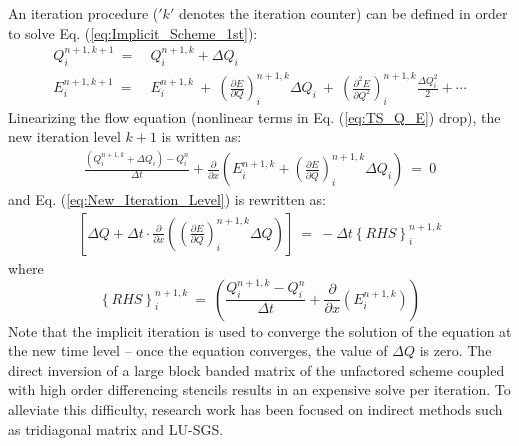 \documentclass[conf]{new-aiaa}
\begin{document}
An iteration procedure ($'k'$ denotes the iteration counter) can be defined in order to solve Eq. (\ref{eq:Implicit_Scheme_1st}):
\begin{equation}
	\label{eq:TS_Q_E}
	\begin{split}
	Q_i^{n+1, k+1}~=&~Q_i^{n+1, k}+\Delta{Q}_i \\
	E_i^{n+1, k+1}~=&~E_i^{n+1, k}~+~\left(\frac{\partial{E}}{\partial{Q}} \right)^{n+1, k}_i\Delta{Q}_i~+~ \left(\frac{\partial^2{E}}{\partial{Q^2}} \right)^{n+1, k}_i\frac{\Delta{Q}^2_i}{2}+\cdots
	\end{split}
\end{equation}
Linearizing the flow equation (nonlinear terms in Eq. (\ref{eq:TS_Q_E}) drop), the new iteration level $k+1$ is written as:
\begin{equation}
	\begin{split}
		\label{eq:New_Iteration_Level}
  			\frac{\left(Q_i^{n+1, k}+\Delta{Q}_i\right)-Q_i^n}{\Delta{t}}+\frac{\partial}{\partial{x}}\left(E_i^{n+1, k} + \left(\frac{\partial{E}}{\partial{Q}} \right)^{n+1, k}_i\Delta{Q}_i\right)~=~0
	\end{split}
\end{equation}
and Eq. (\ref{eq:New_Iteration_Level}) is rewritten as:
\begin{equation}
	\begin{split}
		\label{eq:NS_DeltaForm}
  			\left[\Delta{Q}+\Delta{t}\cdot\frac{\partial}{\partial{x}}\left(\left(\frac{\partial{E}}{\partial{Q}} \right)_i^{n+1,k}\Delta{Q} \right)\right]~=~-\Delta{t}\left\{RHS\right\}_i^{n+1, k}
	\end{split}
\end{equation}
where
\begin{equation*}
	\left\{RHS\right\}_i^{n+1, k}~=~\left(\frac{Q_i^{n+1, k}-Q_i^n}{\Delta{t}}+\frac{\partial}{\partial{x}}\left(E_i^{n+1, k} \right)\right)
\end{equation*}
Note that the implicit iteration is used to converge the solution of the equation at the new time level – once the equation converges, the value of $\Delta{Q}$ is zero. 
The direct inversion of a large block banded matrix of the unfactored scheme coupled with high order differencing stencils results in an expensive solve per iteration. 
To alleviate this difficulty, research work has been focused on indirect methods
such as tridiagonal matrix and LU-SGS. 
\end{document}
